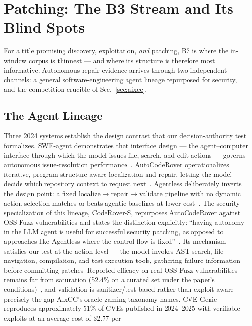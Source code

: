 \documentclass[conference,compsoc]{IEEEtran}
\begin{document}
\section{Patching: The B3 Stream and Its Blind Spots}
\label{sec:patching}

For a title promising discovery, exploitation, \emph{and} patching, B3 is where the in-window
corpus is thinnest --- and where its structure is therefore most informative. Autonomous repair
evidence arrives through two independent channels: a general software-engineering agent lineage
repurposed for security, and the competition crucible of Sec.~\ref{sec:aixcc}.

\subsection{The Agent Lineage}
Three 2024 systems establish the design contrast that our decision-authority test formalizes.
SWE-agent demonstrates that interface design --- the agent--computer interface through which the
model issues file, search, and edit actions --- governs autonomous issue-resolution
performance~\cite{sweagent2024}. AutoCodeRover operationalizes iterative,
program-structure-aware localization and repair, letting the model decide which repository
context to request next~\cite{autocoderoever-2024}. Agentless deliberately inverts the design
point: a fixed localize$\rightarrow$repair$\rightarrow$validate pipeline with no dynamic action
selection matches or beats agentic baselines at lower cost~\cite{agentless2024}. The security
specialization of this lineage, CodeRover-S, repurposes AutoCodeRover against OSS-Fuzz
vulnerabilities and states the distinction explicitly: ``having autonomy in the LLM agent is
useful for successful security patching, as opposed to approaches like Agentless where the
control flow is fixed''~\cite{ossfuzz-aifixing-2024}. Its mechanism satisfies our test at the action
level --- the model invokes AST search, file navigation, compilation, and test-execution tools,
gathering failure information before committing patches. Reported efficacy
on real OSS-Fuzz vulnerabilities remains far from saturation (52.4\% on a curated set under the
paper's conditions)~\cite{ossfuzz-aifixing-2024}, and validation is sanitizer/test-based rather than exploit-aware ---
precisely the gap AIxCC's oracle-gaming taxonomy names. CVE-Genie reproduces approximately 51\%
of CVEs published in 2024--2025 with verifiable exploits at an average cost of \$2.77 per
\end{document}
